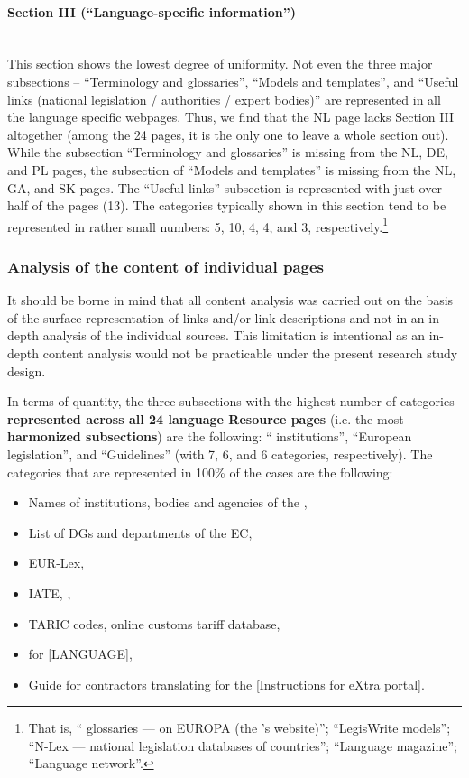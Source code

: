 \documentclass[output=paper]{langsci/langscibook}
\begin{document}
\paragraph*{Section III (“Language-specific information”)}~\\

This section shows the lowest degree of uniformity. Not even the three major subsections – “Terminology and glossaries”, “Models and templates”, and “Useful links (national legislation / authorities / expert bodies)” are represented in all the language specific webpages. Thus, we find that the NL page lacks Section III altogether (among the 24 pages, it is the only one to leave a whole section out). While the subsection “Terminology and glossaries” is missing from the NL, DE, and PL pages, the subsection of “Models and templates” is missing from the NL, GA, and SK pages. The “Useful links” subsection is represented with just over half of the pages (13). The categories typically shown in this section tend to be represented in rather small numbers: 5, 10, 4, 4, and 3, respectively.\footnote{That is, “ glossaries — on EUROPA (the 's website)”; “LegisWrite models”; “N-Lex — national legislation databases of  countries”; “Language magazine”; “Language network”.}

\subsubsection{Analysis of the content of individual pages}\label{sec:svoboda:4.3.3}
It should be borne in mind that all content analysis was carried out on the basis of the surface representation of links and/or link descriptions and not in an in-depth analysis of the individual sources. This limitation is intentional as an in-depth content analysis would not be practicable under the present research study design.

In terms of quantity, the three subsections with the highest number of categories \textbf{represented across all 24 language Resource pages} (i.e. the most \textbf{harmonized subsections}) are the following: “ institutions”, “European legislation”, and “Guidelines” (with 7, 6, and 6 categories, respectively). The categories that are represented in 100\% of the cases are the following:

\begin{itemize}
\item Names of institutions, bodies and agencies of the ,
\item List of DGs and departments of the EC,
\item EUR-Lex,
\item IATE,  ,
\item TARIC codes, online customs tariff database,
\item {} for [LANGUAGE],
\item Guide for contractors translating for the  [Instructions for eXtra portal].
\end{itemize}
\end{document}
